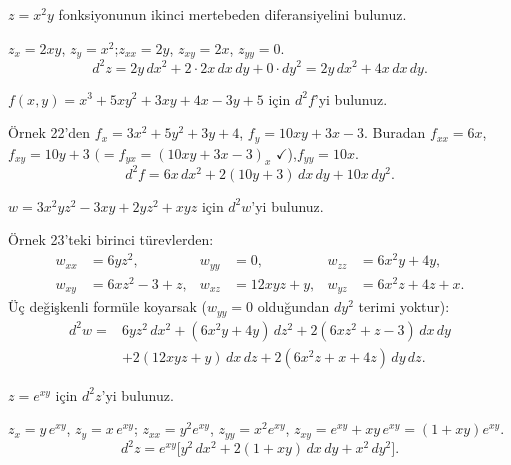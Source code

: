 \begin{soru}
$z=x^2y$ fonksiyonunun ikinci mertebeden diferansiyelini bulunuz.
\end{soru}
\begin{cevap}
$z_x=2xy$, $z_y=x^2$;\quad $z_{xx}=2y$, $z_{xy}=2x$, $z_{yy}=0$.
\[ d^2z=2y\,dx^2+2\cdot2x\,dx\,dy+0\cdot dy^2=2y\,dx^2+4x\,dx\,dy . \]
\end{cevap}

\begin{soru}
$f(x,y)=x^3+5xy^2+3xy+4x-3y+5$ için $d^2f$'yi bulunuz.
\end{soru}
\begin{cevap}
Örnek 22'den $f_x=3x^2+5y^2+3y+4$, $f_y=10xy+3x-3$. Buradan
$f_{xx}=6x$,\quad $f_{xy}=10y+3$ $(=f_{yx}=(10xy+3x-3)_x$ $\checkmark$),\quad $f_{yy}=10x$.
\[ d^2f=6x\,dx^2+2(10y+3)\,dx\,dy+10x\,dy^2 . \]
\end{cevap}

\begin{soru}
$w=3x^2yz^2-3xy+2yz^2+xyz$ için $d^2w$'yi bulunuz.
\end{soru}
\begin{cevap}
Örnek 23'teki birinci türevlerden:
\begin{align*}
w_{xx}&=6yz^2, & w_{yy}&=0, & w_{zz}&=6x^2y+4y,\\
w_{xy}&=6xz^2-3+z, & w_{xz}&=12xyz+y, & w_{yz}&=6x^2z+4z+x .
\end{align*}
Üç değişkenli formüle koyarsak ($w_{yy}=0$ olduğundan $dy^2$ terimi yoktur):
\begin{align*}
d^2w={}&6yz^2\,dx^2+(6x^2y+4y)\,dz^2+2(6xz^2+z-3)\,dx\,dy\\
&+2(12xyz+y)\,dx\,dz+2(6x^2z+x+4z)\,dy\,dz .
\end{align*}
\end{cevap}

\begin{soru}
$z=e^{xy}$ için $d^2z$'yi bulunuz.
\end{soru}
\begin{cevap}
$z_x=y\,e^{xy}$, $z_y=x\,e^{xy}$; $z_{xx}=y^2e^{xy}$, $z_{yy}=x^2e^{xy}$, $z_{xy}=e^{xy}+xy\,e^{xy}=(1+xy)e^{xy}$.
\[ d^2z=e^{xy}\big[y^2\,dx^2+2(1+xy)\,dx\,dy+x^2\,dy^2\big]. \]
\end{cevap}

